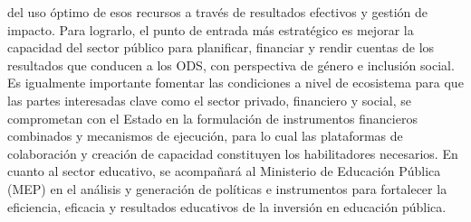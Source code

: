 \documentclass[a4paper, 9pt, conference]{article}              %
\theoremstyle{definition}
\begin{document}
del uso \'optimo de esos recursos a trav\'es de resultados efectivos y gesti\'on de impacto. Para lograrlo, el punto de entrada m\'as estrat\'egico es mejorar la capacidad del sector p\'ublico para planificar, financiar y rendir cuentas de los resultados que conducen a los ODS, con perspectiva de g\'enero e inclusi\'on social. Es igualmente importante fomentar las condiciones a nivel de ecosistema para que las partes interesadas clave como el sector privado, financiero y social, se comprometan con el Estado en la formulaci\'on de instrumentos financieros combinados y mecanismos de ejecuci\'on, para lo cual las plataformas de colaboraci\'on y creaci\'on de capacidad constituyen los habilitadores necesarios. En cuanto al sector educativo, se acompa\~nar\'a al Ministerio de Educaci\'on P\'ublica (MEP) en el an\'alisis y generaci\'on de pol\'iticas e instrumentos para fortalecer la eficiencia, eficacia y resultados educativos de la inversi\'on en educaci\'on p\'ublica.
\end{document}
